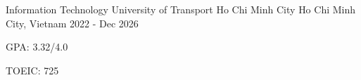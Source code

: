 \begin{cventries} %
  \cventry
    {Information Technology} %
    {University of Transport Ho Chi Minh City} %
    {Ho Chi Minh City, Vietnam} %
    {2022 - Dec 2026} %
    {
      \begin{cvitems} %
        \item {GPA: 3.32/4.0}
        \item {TOEIC: 725}
      \end{cvitems}
    }

\end{cventries}
